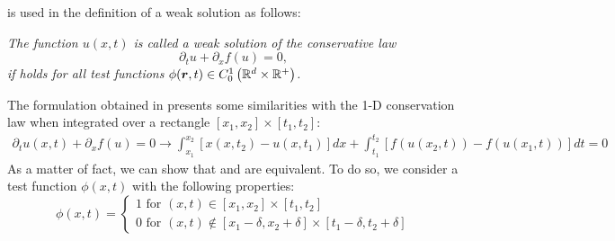 %
 is used in the definition of a weak solution as follows:
%
\begin{definition}
\emph{The function $u(x,t)$ is called a weak solution of the conservative law
%
\begin{equation}
\partial_t u + \partial_x f(u) = 0, \nonumber
\end{equation}
%
if  holds for all test functions $\phi(\boldsymbol r, t) \in C_0^1 \left( \mathbb{R}^d \times \mathbb{R}^+ \right)$.}
\end{definition}
%
The formulation obtained in  presents some similarities with the 1-D conservation law when integrated over a rectangle $\left[ x_1,x_2 \right] \times \left[ t_1,t_2 \right]$:
%
\begin{align}\label{eq:weak_sol4_sct1b}
\partial_t u(x,t) + \partial_x f(u) = 0 \to
\int_{x_1}^{x_2} \left[ x(x,t_2) - u(x,t_1) \right] dx + \int_{t_1}^{t_2} \left[ f(u(x_2,t)) - f(u(x_1,t)) \right]dt = 0
\end{align}
%
As a matter of fact, we can show that  and  are equivalent. To do so, we consider a test function $\phi(x,t)$ with the following properties:
%
\begin{equation}\label{eq:weak_sol5_sct1b}
\phi(x,t) = \left\{
\begin{array}{l}
1  \text{ for }  (x,t) \in \left[ x_1,x_2 \right] \times \left[ t_1,t_2 \right]  \\
0 \text{ for } (x,t) \notin \left[ x_1-\delta,x_2+\delta \right] \times \left[ t_1-\delta,t_2+\delta \right]
\end{array}\right.
\end{equation}
%
